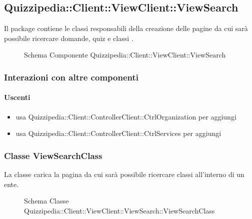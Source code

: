 \subsection{Quizzipedia::Client::ViewClient::ViewSearch}
Il package contiene le classi responsabili della creazione delle pagine da cui sarà possibile ricercare domande, quiz e classi .
\begin{figure}[H]
\centering
\noindent{}
\caption[Schema Componente Quizzipedia::Client::ViewClient::ViewSearch]{Schema Componente Quizzipedia::Client::ViewClient::ViewSearch}
\end{figure}
\subsubsection{Interazioni con altre componenti}
\paragraph{Uscenti}
\begin{itemize}
\item usa Quizzipedia::Client::ControllerClient::CtrlOrganization per aggiungi
\item usa Quizzipedia::Client::ControllerClient::CtrlServices per aggiungi
\end{itemize}
\subsubsection{Classe ViewSearchClass}
La classe carica la pagina da cui sarà possibile ricercare classi all'interno di un ente.
\begin{figure}[H]
\centering
\noindent{}
\caption[Schema Classe ViewSearchClass]{Schema Classe Quizzipedia::Client::ViewClient::ViewSearch::ViewSearchClass}
\end{figure}
